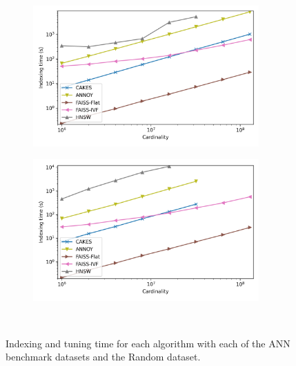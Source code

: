 \begin{figure}
\begin{subfigure}[b]{0.47\textwidth}
        \label{fig:results:glove-25-indexing}
    \end{subfigure}
    \vspace{1em}
    \\
    \begin{subfigure}[b]{0.47\textwidth}
        \includegraphics[width=0.95\textwidth]{plots/sift-indexing.png}\\
        \label{fig:results:sift-indexing}
    \end{subfigure}%
    \begin{subfigure}[b]{0.47\textwidth}
        \includegraphics[width=0.95\textwidth]{plots/random-indexing.png}\\
        \label{fig:results:random-indexing}
    \end{subfigure}%
    \\
    \vspace{1em}
    \caption{Indexing and tuning time for each algorithm with each of the ANN benchmark datasets and the Random dataset.}
    \label{fig:results:indexing}
\end{figure}


